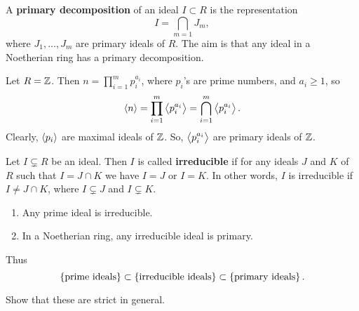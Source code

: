 A \textbf{primary decomposition} of an ideal $ I \subset R $ is the representation
$$ I = \bigcap_{m = 1} J_m, $$
where $ J_1, \dots, J_m $ are primary ideals of $ R $. The aim is that any ideal in a Noetherian ring has a primary decomposition.

\begin{example*}
Let $ R = \mathbb{Z} $. Then $ n = \prod_{i = 1}^m p_i^{a_i} $, where $ p_i $'s are prime numbers, and $ a_i \ge 1 $, so
$$ \left\langle n \right\rangle = \prod_{i = 1}^m \left\langle p_i^{a_i} \right\rangle = \bigcap_{i = 1}^m \left\langle p_i^{a_i} \right\rangle. $$
Clearly, $ \left\langle p_i \right\rangle $ are maximal ideals of $ \mathbb{Z} $. So, $ \left\langle p_i^{a_i} \right\rangle $ are primary ideals of $ \mathbb{Z} $.
\end{example*}

\begin{definition}
Let $ I \subsetneq R $ be an ideal. Then $ I $ is called \textbf{irreducible} if for any ideals $ J $ and $ K $ of $ R $ such that $ I = J \cap K $ we have $ I = J $ or $ I = K $. In other words, $ I $ is irreducible if $ I \ne J \cap K $, where $ I \subsetneq J $ and $ I \subsetneq K $.
\end{definition}

\begin{proposition}
\hfill
\begin{enumerate}
\item Any prime ideal is irreducible.
\item In a Noetherian ring, any irreducible ideal is primary.
\end{enumerate}
\end{proposition}

Thus
$$ \cbr{\text{prime ideals}} \subset \cbr{\text{irreducible ideals}} \subset \cbr{\text{primary ideals}}. $$

\begin{exercise*}
Show that these are strict in general.
\end{exercise*}

\pagebreak

